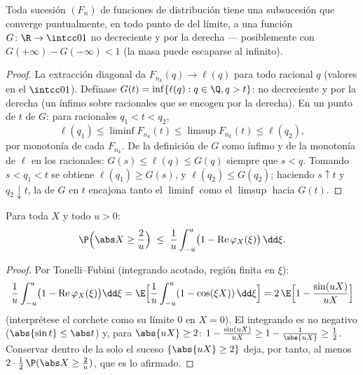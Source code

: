 \begin{theorem}
\label{thm:b3:clt:helly}
Toda sucesión $(F_n)$ de funciones de distribución tiene una subsucesión
que converge puntualmente, en todo punto de
 del límite, a una
función $G \colon
\R \to \intcc01$ no decreciente y
 por la derecha ---
posiblemente con $G(+\infty) - G(-\infty) <
1$ (la masa puede escaparse al infinito).
\end{theorem}

\begin{proof}
La extracción diagonal da $F_{n_k}(q) \to \ell(q)$ para todo racional
$q$ (valores en el 
$\intcc01$). Defínase $G(t) = \inf\{\ell(q) : q \in \Q, q > t\}$: no
decreciente y  por la
derecha (un ínfimo sobre 
racionales que se encogen por la derecha). En un punto de
 $t$ de $G$: para
racionales $q_1 < t < q_2$,
\[
\ell(q_1) \leq \liminf F_{n_k}(t) \leq \limsup F_{n_k}(t)
\leq \ell(q_2),
\]
por monotonía de cada $F_{n_k}$. De la definición de $G$ como ínfimo y
de la monotonía de $\ell$ en los racionales:
$G(s) \leq \ell(q) \leq G(q)$ siempre que $s < q$. Tomando $s < q_1 < t$
se obtiene $\ell(q_1) \geq G(s)$, y $\ell(q_2) \leq G(q_2)$; haciendo
$s \uparrow t$ y $q_2
\downarrow t$, la  de
$G$ en $t$ encajona tanto el $\liminf$ como el $\limsup$ hacia $G(t)$.
\end{proof}

\begin{lemma}
\label{lem:b3:clt:tightness}
Para toda  $X$ y
todo $u > 0$:
\[
\P\Bigl(\abs X \geq \frac2u\Bigr) \;\leq\;
\frac1u\int_{-u}^{u}\bigl(1 -
\operatorname{Re}\varphi_X(\xi)\bigr)\,\dd\xi .
\]
\end{lemma}

\begin{proof}
Por Tonelli--Fubini (integrando acotado, región finita en
$\xi$):
\[
\frac1u\int_{-u}^u\bigl(1 -
\operatorname{Re}\varphi_X(\xi)\bigr)\dd\xi
= \E\Bigl[\frac1u\int_{-u}^u(1 - \cos(\xi X))\,\dd\xi\Bigr]
= 2\,\E\Bigl[1 - \frac{\sin(uX)}{uX}\Bigr]
\]
(interprétese el corchete como su límite $0$ en $X = 0$). El integrando
es no negativo ($\abs{\sin t} \leq \abs t$) y, para $\abs{uX} \geq 2$:
$1 - \frac{\sin(uX)}{uX} \geq 1 -
\frac1{\abs{uX}} \geq \frac12$. Conservar dentro de la
 solo el suceso
$\{\abs{uX} \geq 2\}$ deja, por tanto, al menos
$2 \cdot \frac12\,\P(\abs X \geq \frac2u)$, que es lo afirmado.
\end{proof}

